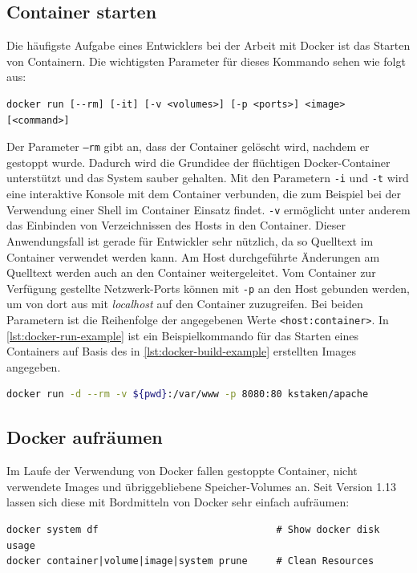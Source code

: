 \subsection{Container starten}
Die häufigste Aufgabe eines Entwicklers bei der Arbeit mit Docker ist das Starten von Containern.
Die wichtigsten Parameter für dieses Kommando sehen wie folgt aus:
\begin{verbatim}
docker run [--rm] [-it] [-v <volumes>] [-p <ports>] <image> [<command>]
\end{verbatim}
Der Parameter \texttt{--rm} gibt an, dass der Container gelöscht wird, nachdem er gestoppt wurde.
Dadurch wird die Grundidee der flüchtigen Docker-Container unterstützt und das System sauber gehalten.
Mit den Parametern \texttt{-i} und \texttt{-t} wird eine interaktive Konsole mit dem Container verbunden, die zum Beispiel bei der Verwendung einer Shell im Container Einsatz findet.
\texttt{-v} ermöglicht unter anderem das Einbinden von Verzeichnissen des Hosts in den Container.
Dieser Anwendungsfall ist gerade für Entwickler sehr nützlich, da so Quelltext im Container verwendet werden kann.
Am Host durchgeführte Änderungen am Quelltext werden auch an den Container weitergeleitet.
Vom Container zur Verfügung gestellte Netzwerk-Ports können mit \texttt{-p} an den Host gebunden werden, um von dort aus mit \emph{localhost} auf den Container zuzugreifen.
Bei beiden Parametern ist die Reihenfolge der angegebenen Werte \texttt{<host:container>}.
In \cref{lst:docker-run-example} ist ein Beispielkommando für das Starten eines Containers auf Basis des in \cref{lst:docker-build-example} erstellten Images angegeben.
\begin{lstlisting}[caption=Docker-Run-Beispiel, language=bash, label=lst:docker-run-example]
docker run -d --rm -v ${pwd}:/var/www -p 8080:80 kstaken/apache
\end{lstlisting}

\subsection{Docker aufräumen}
Im Laufe der Verwendung von Docker fallen gestoppte Container, nicht verwendete Images und übriggebliebene Speicher-Volumes an.
Seit Version 1.13 lassen sich diese mit Bordmitteln von Docker sehr einfach aufräumen:
\begin{verbatim}
docker system df                               # Show docker disk usage
docker container|volume|image|system prune     # Clean Resources
\end{verbatim}

